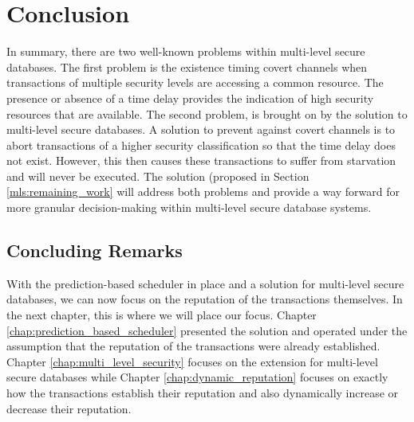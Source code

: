 \section{Conclusion}
\label{mls:conclusion}
In summary, there are two well-known problems within multi-level secure databases. The first problem is the existence timing covert channels when transactions of multiple security levels are accessing a common resource. The presence or absence of a time delay provides the indication of high security resources that are available. The second problem, is brought on by the solution to multi-level secure databases. A solution to prevent against covert channels is to abort transactions of a higher security classification so that the time delay does not exist. However, this then causes these transactions to suffer from starvation and will never be executed. The solution (proposed in Section \ref{mls:remaining_work} will address both problems and provide a way forward for more granular decision-making within multi-level secure database systems.

\subsection{Concluding Remarks}
With the prediction-based scheduler in place and a solution for multi-level secure databases, we can now focus on the reputation of the transactions themselves. In the next chapter, this is where we will place our focus. Chapter \ref{chap:prediction_based_scheduler} presented the solution and operated under the assumption that the reputation of the transactions were already established. Chapter \ref{chap:multi_level_security} focuses on the extension for multi-level secure databases while Chapter \ref{chap:dynamic_reputation} focuses on exactly how the transactions establish their reputation and also dynamically increase or decrease their reputation.